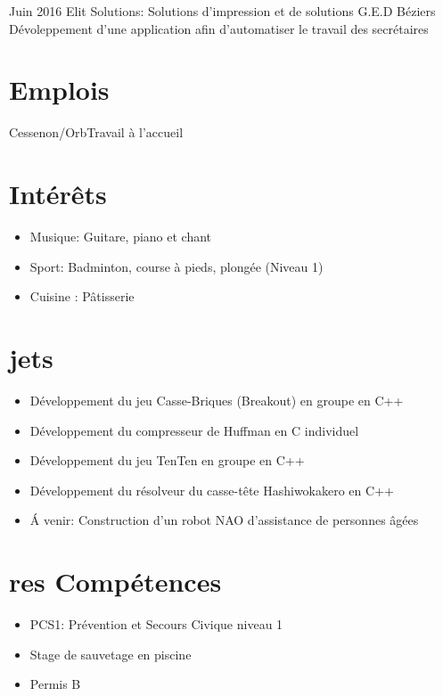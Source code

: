 \documentclass[]{friggeri-cv}
\begin{document}
\begin{entrylist}
  \entry
    {Juin 2016}
    {Elit Solutions: Solutions d'impression et de solutions G.E.D}
    {Béziers}
    {Dévoleppement d'une application afin d'automatiser le travail des secrétaires}

\end{entrylist}

\section{Emplois}
\begin{entrylist}
   { Cessenon/Orb}{Travail à l'accueil}
  
\end{entrylist}

\section{Intérêts}

\begin{itemize}
    \item [\textbullet] Musique: Guitare, piano et chant
    \item [\textbullet] Sport: Badminton, course à pieds, plongée (Niveau 1)
    \item [\textbullet] Cuisine : Pâtisserie
\end{itemize}

\section{\color{z}{Pro}jets}
\begin{itemize}
    \item[\textbullet] Développement du jeu Casse-Briques (Breakout) en groupe en C++
    \item[\textbullet] Développement du compresseur de Huffman en C individuel
    \item[\textbullet] Développement du jeu TenTen en groupe en C++
    \item[\textbullet] Développement du résolveur du casse-tête Hashiwokakero en C++
    \item[\textbullet] \'A venir: Construction d'un robot NAO d'assistance de personnes âgées
\end{itemize}

\section{\color{a}{Aut}res Compétences}
\begin{itemize}
    \item[\textbullet] PCS1: Prévention et Secours Civique niveau 1
    \item[\textbullet] Stage de sauvetage en piscine
    \item[\textbullet] Permis B  
\end{itemize}
\end{document}
